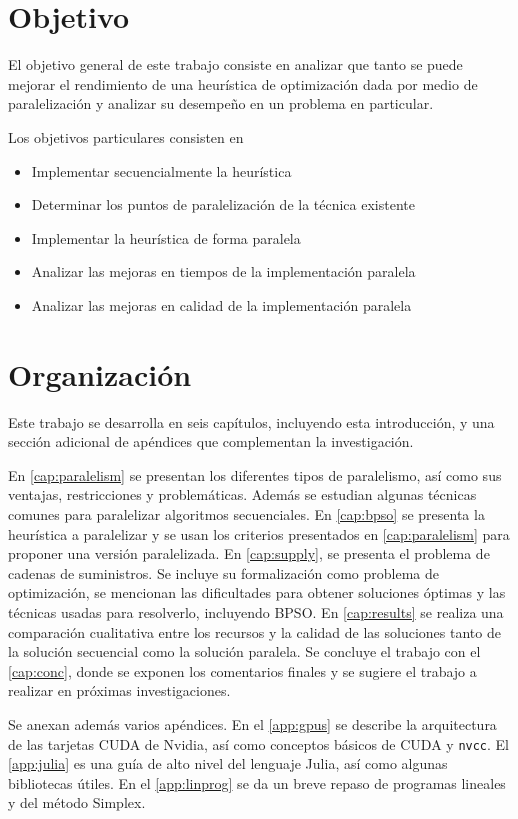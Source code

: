 \section{Objetivo}

El objetivo general de este trabajo consiste en analizar que tanto se puede
mejorar el rendimiento de una heurística de optimización dada por medio de
paralelización y analizar su desempeño en un problema en particular.

Los objetivos particulares consisten en

\begin{itemize}
  \item Implementar secuencialmente la heurística
  \item Determinar los puntos de paralelización de la técnica existente
  \item Implementar la heurística de forma paralela
  \item Analizar las mejoras en tiempos de la implementación paralela
  \item Analizar las mejoras en calidad de la implementación paralela
\end{itemize}

\section {Organización}

Este trabajo se desarrolla en seis capítulos, incluyendo esta introducción, y
una sección adicional de apéndices que complementan la investigación.

En \cref{cap:paralelism} se presentan los diferentes tipos de paralelismo,
así como sus ventajas, restricciones y problemáticas. Además se estudian
algunas técnicas comunes para paralelizar algoritmos secuenciales. En
\cref{cap:bpso} se presenta la heurística a paralelizar y se usan los criterios
presentados en \cref{cap:paralelism} para proponer una versión paralelizada.
En \cref{cap:supply}, se presenta el problema de cadenas de suministros. Se
incluye su formalización como problema de optimización, se mencionan las
dificultades para obtener soluciones óptimas y las técnicas usadas para
resolverlo, incluyendo BPSO. En \cref{cap:results} se realiza una comparación
cualitativa entre los recursos y la calidad de las soluciones tanto de la
solución secuencial como la solución paralela. Se concluye el trabajo con
el \cref{cap:conc}, donde se exponen los comentarios finales y se sugiere el
trabajo a realizar en próximas investigaciones.

Se anexan además varios apéndices. En el \cref{app:gpus} se describe la
arquitectura de las tarjetas CUDA de Nvidia, así como conceptos básicos de
CUDA y \texttt{nvcc}. El \cref{app:julia} es una guía de alto nivel del
lenguaje Julia, así como algunas bibliotecas útiles. En el \cref{app:linprog}
se da un breve repaso de programas lineales y del método Simplex.
